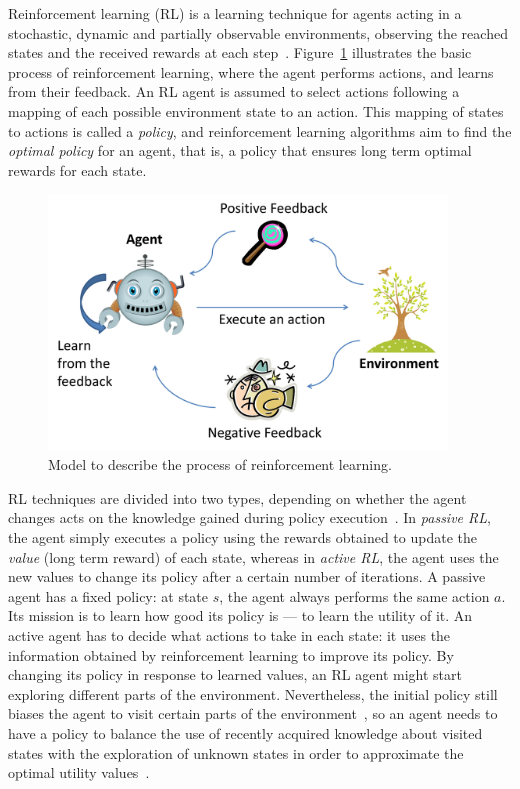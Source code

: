 Reinforcement learning (RL) is a learning technique for agents acting in a stochastic, dynamic and partially observable environments, observing the reached states and the received rewards at each step~\cite{sutton1998reinforcement}. 
Figure~\ref{fig:rl} illustrates the basic process of reinforcement learning, where the agent performs actions, and learns from their feedback. 
An RL agent is assumed to select actions following a mapping of each possible environment state to an action. 
This mapping of states to actions is called a \emph{policy}, and reinforcement learning algorithms aim to find the \emph{optimal policy} for an agent, that is, a policy that ensures long term optimal rewards for each state. 

\begin{figure}[ht]
\centering
\includegraphics[width=400px]{images/rl}
\caption{Model to describe the process of reinforcement learning.}
\label{fig:rl}
\end{figure}

RL techniques are divided into two types, depending on whether the agent changes acts on the knowledge gained during policy execution~\cite{russell1995artificial}. 
In \emph{passive RL}, the agent simply executes a policy using the rewards obtained to update the \emph{value} (long term reward) of each state, whereas in \emph{active RL}, the agent uses the new values to change its policy after a certain number of iterations.
A passive agent has a fixed policy: at state $s$, the agent always performs the same action $a$.
Its mission is to learn how good its policy is --- to learn the utility of it.
An active agent has to decide what actions to take in each state:
it uses the information obtained by reinforcement learning to improve its policy. 
By changing its policy in response to learned values, an RL agent might start exploring different parts of the environment. 
Nevertheless, the initial policy still biases the agent to visit certain parts of the environment~\cite{russell1995artificial}, so an agent needs to have a policy to balance the use of recently acquired knowledge about visited states with the exploration of unknown states in order to approximate the optimal utility values~\cite{ghory2004boardgames}. 



